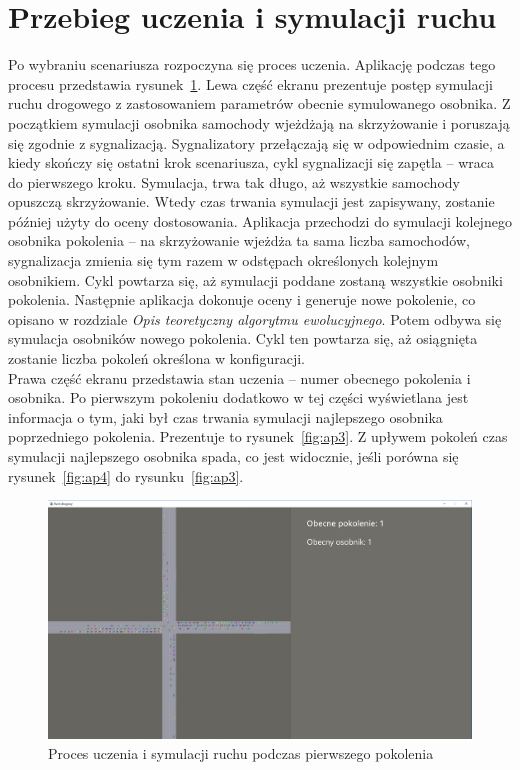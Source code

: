 \section*{Przebieg uczenia i symulacji ruchu}
Po wybraniu scenariusza rozpoczyna się proces uczenia. Aplikację podczas tego procesu przedstawia rysunek~\ref{fig:ap2}. Lewa część ekranu prezentuje postęp symulacji ruchu drogowego z zastosowaniem parametrów obecnie symulowanego osobnika. Z początkiem symulacji osobnika samochody wjeżdżają na skrzyżowanie i poruszają się zgodnie z sygnalizacją. Sygnalizatory przełączają się w odpowiednim czasie, a kiedy skończy się ostatni krok scenariusza, cykl sygnalizacji się zapętla -- wraca do pierwszego kroku. Symulacja, trwa tak długo, aż wszystkie samochody opuszczą skrzyżowanie. Wtedy czas trwania symulacji jest zapisywany, zostanie później użyty do oceny dostosowania. Aplikacja przechodzi do symulacji kolejnego osobnika pokolenia -- na skrzyżowanie wjeżdża ta sama liczba samochodów, sygnalizacja zmienia się tym razem w odstępach określonych kolejnym osobnikiem. Cykl powtarza się, aż symulacji poddane zostaną wszystkie osobniki pokolenia. Następnie aplikacja dokonuje oceny i generuje nowe pokolenie, co opisano w rozdziale \textit{Opis teoretyczny algorytmu ewolucyjnego}. Potem odbywa się symulacja osobników nowego pokolenia. Cykl ten powtarza się, aż osiągnięta zostanie liczba pokoleń określona w konfiguracji. \\
Prawa część ekranu przedstawia stan uczenia -- numer obecnego pokolenia i osobnika. Po pierwszym pokoleniu dodatkowo w tej części wyświetlana jest informacja o tym, jaki był czas trwania symulacji najlepszego osobnika poprzedniego pokolenia. Prezentuje to rysunek~\ref{fig:ap3}. Z upływem pokoleń czas symulacji najlepszego osobnika spada, co jest widocznie, jeśli porówna się rysunek~\ref{fig:ap4} do rysunku~\ref{fig:ap3}.
\begin{figure}[h]
	\centering
	\includegraphics[width=1\linewidth]{ap2}
	\caption[Proces uczenia i symulacji ruchu]{Proces uczenia i symulacji ruchu podczas pierwszego pokolenia}
	\label{fig:ap2}
\end{figure}
